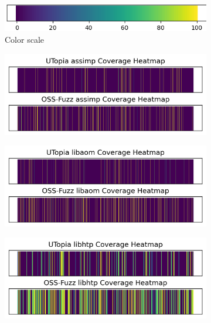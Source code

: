 \documentclass[a4paper,11pt,oneside]{report}
\begin{document}
\begin{figure}[ht]
    \centering
    \begin{subfigure}{\textwidth}
        \centering
        \includegraphics[width=\linewidth]{figures/scale.png}
        \caption{Color scale}
    \end{subfigure}%
    \hfill
    \begin{subfigure}{0.5\textwidth}
        \centering
        \includegraphics[width=\linewidth]{figures/coverage_plot_assimp.png}
    \end{subfigure}%
    \hfill
    \begin{subfigure}{0.5\textwidth}
        \centering
        \includegraphics[width=\linewidth]{figures/coverage_plot_libaom.png}
    \end{subfigure}
    \begin{subfigure}{0.5\textwidth}
        \centering
        \includegraphics[width=\linewidth]{figures/coverage_plot_libhtp.png}

\end{subfigure}
\end{figure}
\end{document}
